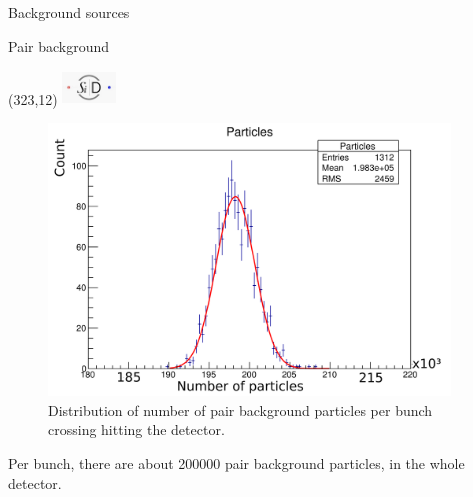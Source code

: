 \documentclass[xcolor={dvipsnames}]{beamer}
\newcommand{\sidlogo}{
  \setlength{\TPHorizModule}{1pt}
  \setlength{\TPVertModule}{1pt}
  \begin{textblock}{1}(323,12)
   \includegraphics[width=40pt,height=26pt]{figures/SiD.jpeg}
  \end{textblock}
  }
\begin{document}
\begin{frame}{Background sources}
\vspace*{0.5cm}
\end{frame}

\begin{frame}{Pair background}
\sidlogo
 \begin{figure}
 	\begin{columns}
        \begin{flushright}
        \includegraphics[height=0.55\textheight]{figures/sidloi3_pairs_1312_EcalEndcap_HitsPerFile_Particles.png}
        \end{flushright}
        \begin{flushleft}
        \caption{\small Distribution of number of pair background particles per bunch crossing hitting the detector.}
        \end{flushleft}
      \end{columns}
\end{figure}
Per bunch, there are about \num{200000} pair background particles, in the whole detector.\\
\end{frame}
\end{document}
